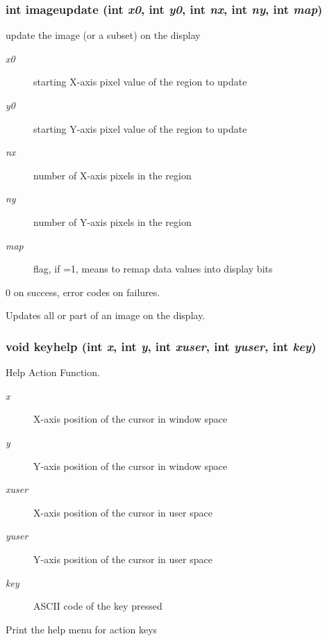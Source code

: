 \subsubsection{\setlength{\rightskip}{0pt plus 5cm}int imageupdate (int {\em x0}, int {\em y0}, int {\em nx}, int {\em ny}, int {\em map})}\label{xtvutils_8c_a169}


update the image (or a subset) on the display 

\begin{Desc}
\item[Parameters:]
\begin{description}
\item[{\em x0}]starting X-axis pixel value of the region to update \item[{\em y0}]starting Y-axis pixel value of the region to update \item[{\em nx}]number of X-axis pixels in the region \item[{\em ny}]number of Y-axis pixels in the region \item[{\em map}]flag, if =1, means to remap data values into display bits\end{description}
\end{Desc}
\begin{Desc}
\item[Returns:]0 on success, error codes on failures.\end{Desc}
Updates all or part of an image on the display. 
\subsubsection{\setlength{\rightskip}{0pt plus 5cm}void keyhelp (int {\em x}, int {\em y}, int {\em xuser}, int {\em yuser}, int {\em key})}\label{xtvutils_8c_a215}


Help Action Function. 

\begin{Desc}
\item[Parameters:]
\begin{description}
\item[{\em x}]X-axis position of the cursor in window space \item[{\em y}]Y-axis position of the cursor in window space \item[{\em xuser}]X-axis position of the cursor in user space \item[{\em yuser}]Y-axis position of the cursor in user space \item[{\em key}]ASCII code of the key pressed\end{description}
\end{Desc}
Print the help menu for action keys 
